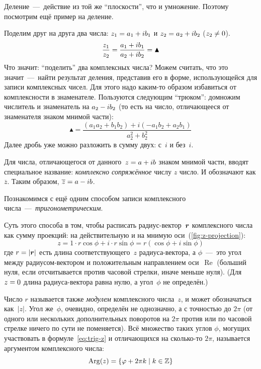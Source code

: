 \documentclass[a4paper,12pt]{article}
\DeclareMathOperator{\Arg}{Arg}
\DeclareMathOperator{\Real}{Re}
\begin{document}
  Деление~---~действие из той же ``плоскости'', что и умножение.
  Поэтому посмотрим ещё пример на деление.

  \begin{example}
    Поделим друг на друга два числа: $z_1 \hm= a_1 \hm+ i b_1$ и $z_2 \hm= a_2 \hm+ i b_2$ ($z_2 \hm{\not=} 0$).
    \[
      \frac{z_1}{z_2} = \frac{a_1 \hm+ i b_1}{a_2 \hm+ i b_2} = \blacktriangle
    \]
    Что значит: ``поделить'' два комплексных числа?
    Можем считать, что это значит~---~найти результат деления, представив его в форме, использующейся для записи комплексных чисел.
    Для этого надо каким-то образом избавиться от комплексности в знаменателе.
    Пользуются следующим ``трюком'': домножим числитель и знаменатель на $a_2 \hm- i b_2$ (то есть на число, отличающееся от знаменателя знаком мнимой части):
    \[
      \blacktriangle = \frac{(a_1 a_2 + b_1 b_2) + i(-a_1 b_2 + a_2 b_1)}{a_2^2 + b_2^2}
    \]
    Далее дробь уже можно разложить в сумму двух: с~$i$ и без~$i$.

    Для числа, отличающегося от данного~$z \hm= a \hm+ ib$ знаком мнимой части, вводят специальное название: \emph{комплексно сопряжённое} числу $z$ число.
    И обозначают как $\overline{z}$.
    Таким образом, $\overline{z} \hm= a \hm- ib$.
  \end{example}

  \medskip
  
  Познакомимся с ещё одним способом записи комплексного числа~---~\emph{тригонометрическим}.
  
  Суть этого способа в том, чтобы расписать радиус-вектор~$\boldsymbol r$ комплексного числа как сумму проекций: на действительную и на мнимую оси~(\ref{fig:z-projection}):
  \begin{equation}\label{eq:trig-z}
    z = 1 \cdot r\cos \phi + i \cdot r \sin \phi = r(\cos \phi + i \sin \phi)
  \end{equation}
  где $r \hm= |\bds r|$ есть длина соответствующего~$z$ радиуса-вектора, а $\phi$~---~это угол между радиусом-вектором и положительным направлением оси~$\Real$ (больший нуля, если отсчитывается против часовой стрелки, иначе меньше нуля).
  (Для $z \hm= 0$ длина радиуса-вектора равна нулю, а угол~$\phi$ не определён.)

  Число $r$ называется также \emph{модулем} комплексного числа~$z$, и может обозначаться как~$|z|$.
  Угол же~$\phi$, очевидно, определён не однозначно, а с точностью до $2\pi$ (от одного или нескольких дополнительных поворотов на $2\pi$ против или по часовой стрелке ничего по сути не поменяется).  %
  Всё множество таких углов $\phi$, могущих участвовать в формуле~\eqref{eq:trig-z} и отличающихся на сколько-то $2 \pi$, называется аргументом комплексного числа:
  \[
    \Arg(z) = \{\phi + 2\pi k \mid k \in \ZZ\}
  \]
\end{document}
